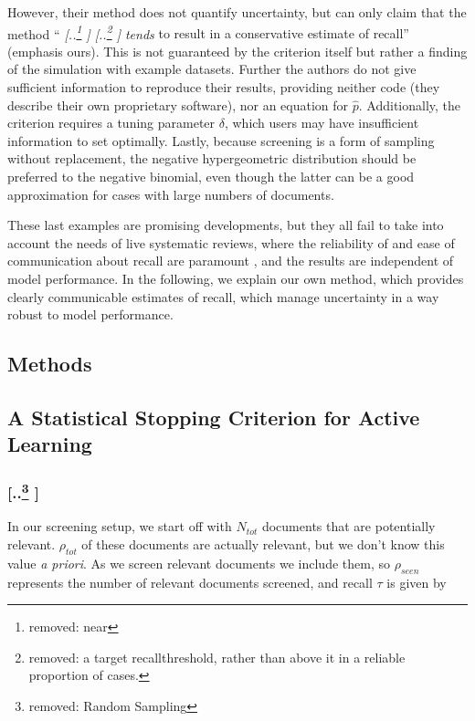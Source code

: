 \documentclass{bmcart}
\providecommand{\DIFadd}[1]{{\protect\color{blue} \sf #1}} %
\providecommand{\DIFdel}[1]{{\protect\color{red} [..\footnote{removed: #1} ]}} %
\providecommand{\DIFaddbegin}{} %
\providecommand{\DIFaddend}{} %
\providecommand{\DIFdelbegin}{} %
\providecommand{\DIFdelend}{} %
\newcommand{\DIFscaledelfig}{0.5}
\newlength{\DIFdelgraphicswidth} %
\newlength{\DIFdelgraphicsheight} %
\newcommand{\DIFaddincludegraphics}[2][]{{\color{blue}\fbox{\DIFOincludegraphics[#1]{#2}}}} %
\newcommand{\DIFdelincludegraphics}[2][]{%
\sbox{\DIFdelgraphicsbox}{\DIFOincludegraphics[#1]{#2}}%
\settoboxwidth{\DIFdelgraphicswidth}{\DIFdelgraphicsbox} %
\settoboxtotalheight{\DIFdelgraphicsheight}{\DIFdelgraphicsbox} %
\scalebox{\DIFscaledelfig}{%
\parbox[b]{\DIFdelgraphicswidth}{\usebox{\DIFdelgraphicsbox}\\[-\baselineskip] \rule{\DIFdelgraphicswidth}{0em}}\llap{\resizebox{\DIFdelgraphicswidth}{\DIFdelgraphicsheight}{%
\setlength{\unitlength}{\DIFdelgraphicswidth}%
\begin{picture}(1,1)%
\thicklines\linethickness{2pt} %
{\color[rgb]{1,0,0}\put(0,0){\framebox(1,1){}}}%
{\color[rgb]{1,0,0}\put(0,0){\line( 1,1){1}}}%
{\color[rgb]{1,0,0}\put(0,1){\line(1,-1){1}}}%
\end{picture}%
}\hspace*{3pt}}} %
} %
\DeclareRobustCommand{\DIFaddbegin}{\DIFOaddbegin \let\includegraphics\DIFaddincludegraphics} %
\DeclareRobustCommand{\DIFaddend}{\DIFOaddend \let\includegraphics\DIFOincludegraphics} %
\DeclareRobustCommand{\DIFdelbegin}{\DIFOdelbegin \let\includegraphics\DIFdelincludegraphics} %
\DeclareRobustCommand{\DIFdelend}{\DIFOaddend \let\includegraphics\DIFOincludegraphics} %
\begin{document}
	\DIFadd{However, their method does not quantify uncertainty, but can only claim that the method ``}\DIFaddend \textit{\DIFdelbegin \DIFdel{near}%
\DIFdel{a target recallthreshold, rather than above it in a reliable proportion of cases. 
}\DIFdelend \DIFaddbegin \DIFadd{tends}} \DIFadd{to result in a conservative estimate of recall'' (emphasis ours). This is not guaranteed by the criterion itself but rather a finding of the simulation with example datasets. Further the authors do not give sufficient information to reproduce their results, providing neither code (they describe their own proprietary software), nor an equation for $\hat{p}$. Additionally, the criterion requires a tuning parameter $\delta$, which users may have insufficient information to set optimally.
	Lastly, because screening is a form of sampling without replacement, the negative hypergeometric distribution should be preferred to the negative binomial, even though the latter can be a good approximation for cases with large numbers of documents.
	}

	\DIFaddend These last examples are promising developments, but \DIFaddbegin \DIFadd{they all }\DIFaddend fail to take into account the needs of live systematic reviews, where the reliability of and ease of communication about recall are paramount\DIFaddbegin \DIFadd{, and the results are independent of model performance. In the following, we explain our own method, which provides clearly communicable estimates of recall, which manage uncertainty in a way robust to model performance}\DIFaddend .

	\subsection*{Methods}

	\subsection*{A Statistical Stopping Criterion for Active Learning}

	\DIFdelbegin \subsubsection*{\DIFdel{Random Sampling}}
\DIFdelend \DIFaddbegin \DIFadd{In our screening setup, we start off with $N_{tot}$ documents that are potentially relevant. $\rho_{tot}$ of these documents are actually relevant, but we don't know this value \textit{a priori}. As we screen relevant documents we include them, so $\rho_{seen}$ represents the number of relevant documents screened, and recall $\tau$ is given by 
	}\DIFaddend 
\end{document}
